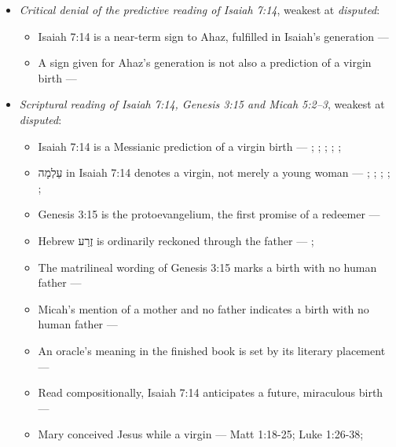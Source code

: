 \documentclass[11pt]{article}
\begin{document}
\begin{itemize}
\item \emph{Critical denial of the predictive reading of Isaiah 7:14}, weakest at \emph{disputed}:
\begin{itemize}
\item Isaiah 7:14 is a near-term sign to Ahaz, fulfilled in Isaiah's generation --- \cite{brown-birth-messiah-1993}
\item A sign given for Ahaz's generation is not also a prediction of a virgin birth --- \cite{brown-birth-messiah-1993}
\end{itemize}
\item \emph{Scriptural reading of Isaiah 7:14, Genesis 3:15 and Micah 5:2–3}, weakest at \emph{disputed}:
\begin{itemize}
\item Isaiah 7:14 is a Messianic prediction of a virgin birth --- \cite[ad loc. Isa 7:14]{motyer-isaiah-1993}; \cite[123]{motyer-context-content-1970}; \cite[12--14]{compton-immanuel-prophecy-2007}; \cite[66]{justin-dialogue-with-trypho-160}; \cite[III.21.6]{irenaeus-against-heresies-180}; \cite[I.35]{origen-against-celsus-248}
\item עַלְמָה in Isaiah 7:14 denotes a virgin, not merely a young woman --- \cite[ad loc. Isa 7:14]{motyer-isaiah-1993}; \cite[app. Isa 7:14]{bhs-1997}; \cite[1653--1654]{berry-virgin-birth-2003}; \cite[125]{motyer-context-content-1970}; \cite[7--8]{compton-immanuel-prophecy-2007}; \cite[I.32]{jerome-against-jovinianus-393}
\item Genesis 3:15 is the protoevangelium, the first promise of a redeemer --- \cite[9--10]{miravalle-meet-mary-2007}
\item Hebrew זֶרַע is ordinarily reckoned through the father --- \cite[9--10]{miravalle-meet-mary-2007}; \cite[app. Gen 3:15]{bhs-1997}
\item The matrilineal wording of Genesis 3:15 marks a birth with no human father --- \cite[9--10]{miravalle-meet-mary-2007}
\item Micah's mention of a mother and no father indicates a birth with no human father --- \cite[9--10]{miravalle-meet-mary-2007}
\item An oracle's meaning in the finished book is set by its literary placement --- \cite[483--486]{postell-isaiah-messianic-2025}
\item Read compositionally, Isaiah 7:14 anticipates a future, miraculous birth --- \cite[490--493]{postell-isaiah-messianic-2025}
\item Mary conceived Jesus while a virgin --- Matt 1:18-25; Luke 1:26-38; \cite[30--33]{brown-problem-virginal-conception-1972}

\end{itemize}
\end{itemize}
\end{document}
